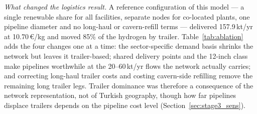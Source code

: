 \documentclass[preprint,12pt,authoryear]{elsarticle}
\begin{document}
\textit{What changed the logistics result.} A reference configuration of this model --- a single renewable share for all facilities, separate nodes for co-located plants, one pipeline diameter and no long-haul or cavern-refill terms --- delivered 157.9\,kt/yr at 10.70\,€/kg and moved 85\% of the hydrogen by trailer. Table~\ref{tab:ablation} adds the four changes one at a time: the sector-specific demand basis shrinks the network but leaves it trailer-based; shared delivery points and the 12-inch class make pipelines worthwhile at the 20--60\,kt/yr flows the network actually carries; and correcting long-haul trailer costs and costing cavern-side refilling remove the remaining long trailer legs. Trailer dominance was therefore a consequence of the network representation, not of Turkish geography, though how far pipelines displace trailers depends on the pipeline cost level (Section~\ref{sec:stage3_sens}).

\begin{table}[htbp]
\centering
\caption{Stepwise decomposition from a reference configuration to the baseline design. Each row adds one change to the row above. Delivered cost is $E_{\text{Me}}[z]$ per kg delivered.}
\label{tab:ablation}
\end{table}
\end{document}
